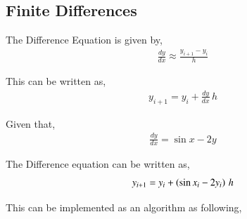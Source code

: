 \documentclass[journal]{IEEEtran}
\begin{document}
    \subsection{Finite Differences}
       The Difference Equation is given by,
       \begin{align}
        \frac{dy}{dx} \approx \frac{y_{i+1} - y_i}{h}
       \end{align}

       This can be written as,
       \begin{align}
            y_{i+1} = y_i + \frac{dy}{dx} \, h
       \end{align}

       Given that,
       \begin{align}
        \frac{dy}{dx} = \sin{x} - 2y
       \end{align}

       The Difference equation can be written as,
       \begin{align}
        y_{i+1} = y_i + \left(\sin{x_i} - 2y_i\right)\, h
       \end{align}

    This can be implemented as an algorithm as following,
\end{document}
